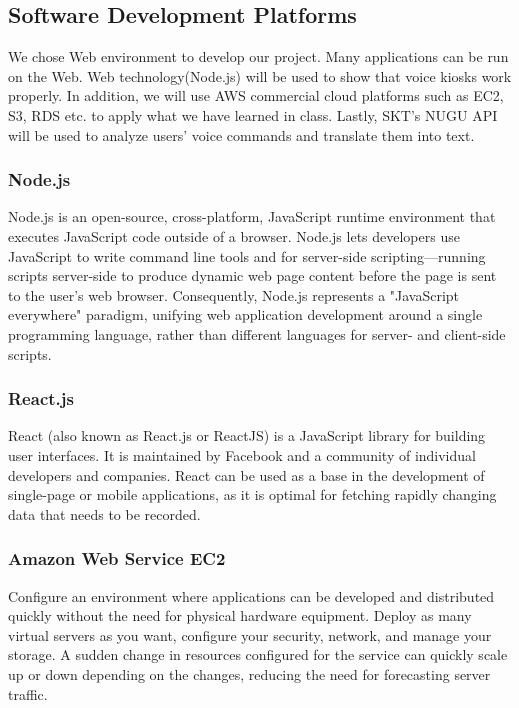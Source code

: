 \documentclass[conference,compsoc]{IEEEtran}
\begin{document}
\subsection{Software Development Platforms}

We chose Web environment to develop our project. Many applications can be run on the Web. Web technology(Node.js) will be used to show that voice kiosks work properly. In addition, we will use AWS commercial cloud platforms such as EC2, S3, RDS etc. to apply what we have learned in class. Lastly, SKT's NUGU API will be used to analyze users' voice commands and translate them into text.

\subsubsection{Node.js}

Node.js is an open-source, cross-platform, JavaScript runtime environment that executes JavaScript code outside of a browser. Node.js lets developers use JavaScript to write command line tools and for server-side scripting—running scripts server-side to produce dynamic web page content before the page is sent to the user's web browser. Consequently, Node.js represents a "JavaScript everywhere" paradigm, unifying web application development around a single programming language, rather than different languages for server- and client-side scripts.

\subsubsection{React.js}

React (also known as React.js or ReactJS) is a JavaScript library for building user interfaces. It is maintained by Facebook and a community of individual developers and companies. React can be used as a base in the development of single-page or mobile applications, as it is optimal for fetching rapidly changing data that needs to be recorded.

\subsubsection{Amazon Web Service EC2}

Configure an environment where applications can be developed and distributed quickly without the need for physical hardware equipment. Deploy as many virtual servers as you want, configure your security, network, and manage your storage. A sudden change in resources configured for the service can quickly scale up or down depending on the changes, reducing the need for forecasting server traffic.
\end{document}
